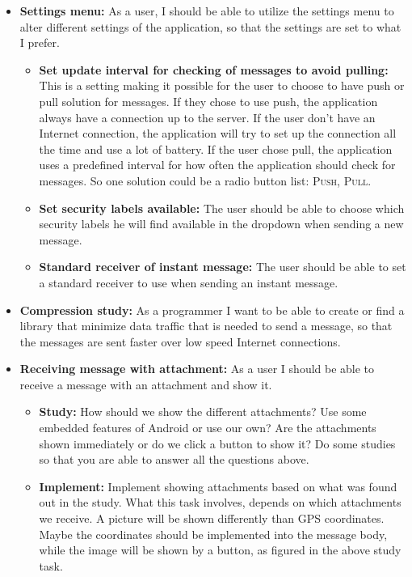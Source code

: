 \begin{itemize}
\newpage

\item{}\textbf{Settings menu:} As a user, I should be able to utilize the settings menu to alter different settings of the application, so that the settings are set to what I prefer.
\begin{itemize}
\item{}\textbf{Set update interval for checking of messages to avoid pulling:} This is a setting making it possible for the user to choose to have push or pull solution for messages. If they chose to use push, the application always have a connection up to the server. If the user don’t have an Internet connection, the application will try to set up the connection all the time and use a lot of battery. If the user chose pull, the application uses a predefined interval for how often the application should check for messages. So one solution could be a radio button list: \textsc{Push}, \textsc{Pull}.
\item{}\textbf{Set security labels available:} The user should be able to choose which security labels he will find available in the dropdown when sending a new message.
\item{}\textbf{Standard receiver of instant message:} The user should be able to set a standard receiver to use when sending an instant message.
\end{itemize}
\item{}\textbf{Compression study:} As a programmer I want to be able to create or find a library that minimize data traffic that is needed to send a message, so that the messages are sent faster over low speed Internet connections.
\item{}\textbf{Receiving message with attachment:} As a user I should be able to receive a message with an attachment and show it.
\begin{itemize}
\item{}\textbf{Study:} How should we show the different attachments? Use some embedded features of Android or use our own? Are the attachments shown immediately or do we click a button to show it? Do some studies so that you are able to answer all the questions above.
\item{}\textbf{Implement:} Implement showing attachments based on what was found out in the study. What this task involves, depends on which attachments we receive. A picture will be shown differently than GPS coordinates. Maybe the coordinates should be implemented into the message body, while the image will be shown by a button, as figured in the above study task.

\end{itemize}
\end{itemize}
